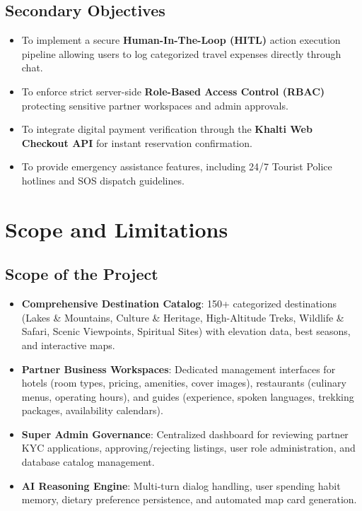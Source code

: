 \documentclass[12pt,a4paper]{report}
\begin{document}
\subsection{Secondary Objectives}
\begin{itemize}
    \item To implement a secure \textbf{Human-In-The-Loop (HITL)} action execution pipeline allowing users to log categorized travel expenses directly through chat.
    \item To enforce strict server-side \textbf{Role-Based Access Control (RBAC)} protecting sensitive partner workspaces and admin approvals.
    \item To integrate digital payment verification through the \textbf{Khalti Web Checkout API} for instant reservation confirmation.
    \item To provide emergency assistance features, including 24/7 Tourist Police hotlines and SOS dispatch guidelines.
\end{itemize}

\section{Scope and Limitations}

\subsection{Scope of the Project}
\begin{itemize}
    \item \textbf{Comprehensive Destination Catalog}: 150+ categorized destinations (Lakes \& Mountains, Culture \& Heritage, High-Altitude Treks, Wildlife \& Safari, Scenic Viewpoints, Spiritual Sites) with elevation data, best seasons, and interactive maps.
    \item \textbf{Partner Business Workspaces}: Dedicated management interfaces for hotels (room types, pricing, amenities, cover images), restaurants (culinary menus, operating hours), and guides (experience, spoken languages, trekking packages, availability calendars).
    \item \textbf{Super Admin Governance}: Centralized dashboard for reviewing partner KYC applications, approving/rejecting listings, user role administration, and database catalog management.
    \item \textbf{AI Reasoning Engine}: Multi-turn dialog handling, user spending habit memory, dietary preference persistence, and automated map card generation.
\end{itemize}
\end{document}
